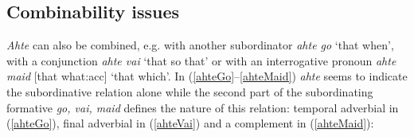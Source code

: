 \documentclass[a4,12pt]{scrartcl}
\begin{document}
\subsection{Combinability issues}
%
%
{\it Ahte} can also be combined, e.g. with another subordinator {\it ahte go} ‘that when’, with a conjunction {\it ahte vai} ‘that so that’ or with an interrogative pronoun {\it ahte maid} [that what:{\sc acc}] ‘that which'. In (\ref{ahteGo}–\ref{ahteMaid}) {\it ahte} seems to indicate the subordinative relation alone while the second part of the subordinating formative {\it go, vai, maid} defines the nature of this relation: temporal adverbial in (\ref{ahteGo}), final adverbial in (\ref{ahteVai}) and a complement in (\ref{ahteMaid}):%
\end{document}
